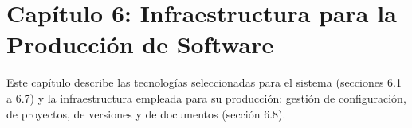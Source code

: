 
\newpage
\section{Capítulo 6: Infraestructura para la Producción de Software}\label{cap:infraestructura}


Este capítulo describe las tecnologías seleccionadas para el sistema (secciones 6.1 a 6.7) y la infraestructura empleada para su producción: gestión de configuración, de proyectos, de versiones y de documentos (sección 6.8).
















